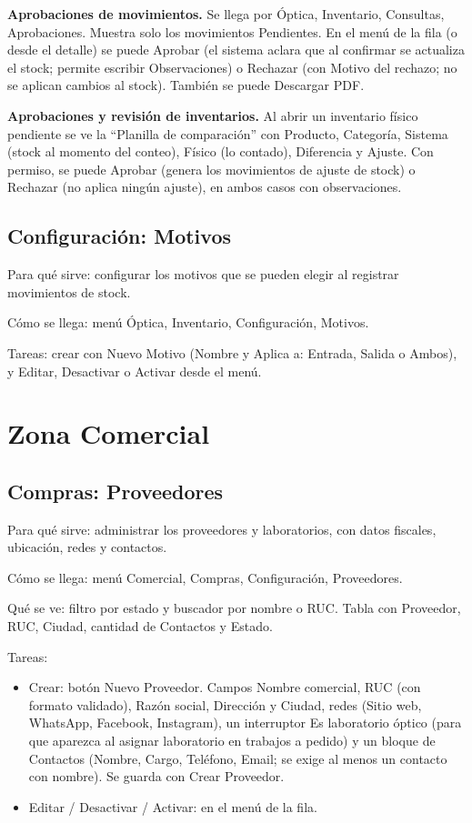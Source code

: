 \textbf{Aprobaciones de movimientos.} Se llega por Óptica, Inventario, Consultas, Aprobaciones. Muestra solo los movimientos Pendientes. En el menú de la fila (o desde el detalle) se puede Aprobar (el sistema aclara que al confirmar se actualiza el stock; permite escribir Observaciones) o Rechazar (con Motivo del rechazo; no se aplican cambios al stock). También se puede Descargar PDF.

\textbf{Aprobaciones y revisión de inventarios.} Al abrir un inventario físico pendiente se ve la ``Planilla de comparación'' con Producto, Categoría, Sistema (stock al momento del conteo), Físico (lo contado), Diferencia y Ajuste. Con permiso, se puede Aprobar (genera los movimientos de ajuste de stock) o Rechazar (no aplica ningún ajuste), en ambos casos con observaciones.

\subsection{Configuración: Motivos}
\label{sec:mu-configuracion-motivos}

Para qué sirve: configurar los motivos que se pueden elegir al registrar movimientos de stock.

Cómo se llega: menú Óptica, Inventario, Configuración, Motivos.

Tareas: crear con Nuevo Motivo (Nombre y Aplica a: Entrada, Salida o Ambos), y Editar, Desactivar o Activar desde el menú.

\section{Zona Comercial}
\label{sec:mu-zona-comercial}

\subsection{Compras: Proveedores}
\label{sec:mu-compras-proveedores}

Para qué sirve: administrar los proveedores y laboratorios, con datos fiscales, ubicación, redes y contactos.

Cómo se llega: menú Comercial, Compras, Configuración, Proveedores.

Qué se ve: filtro por estado y buscador por nombre o RUC. Tabla con Proveedor, RUC, Ciudad, cantidad de Contactos y Estado.

Tareas:
\begin{itemize}
  \item Crear: botón Nuevo Proveedor. Campos Nombre comercial, RUC (con formato validado), Razón social, Dirección y Ciudad, redes (Sitio web, WhatsApp, Facebook, Instagram), un interruptor Es laboratorio óptico (para que aparezca al asignar laboratorio en trabajos a pedido) y un bloque de Contactos (Nombre, Cargo, Teléfono, Email; se exige al menos un contacto con nombre). Se guarda con Crear Proveedor.
  \item Editar / Desactivar / Activar: en el menú de la fila.
\end{itemize}

